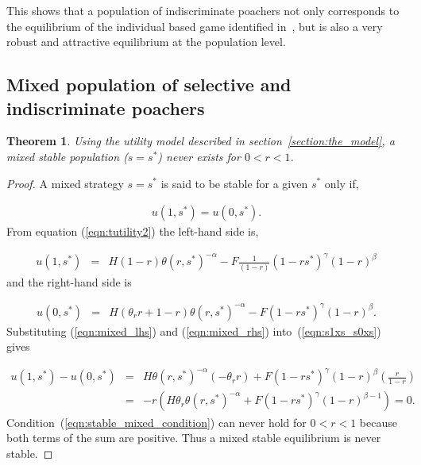 \documentclass[10pt]{article}
\newtheorem{theorem}{Theorem}
\begin{document}
This shows that a population of indiscriminate poachers
not only corresponds to the equilibrium of the individual based
game identified in~\cite{Lee}, but is also a very robust and attractive
equilibrium at the population level.

\subsection{Mixed population of selective and indiscriminate poachers}

\begin{theorem}\label{theorem:mixed}
Using the utility model described in section~\ref{section:the_model}, a mixed
stable population (\(s=s^*\)) never exists for \(0 < r <1\).
\end{theorem}

\begin{proof}
    A mixed strategy \(s = s^*\) is said to be stable for a
    given \(s^*\) only if,

    \begin{eqnarray}
    \label{eqn:s1xs_s0xs}
    u(1,s^*) = u(0,s^*).
    \end{eqnarray}
    From equation (\ref{eqn:tutility2}) the left-hand side is,

    \begin{eqnarray}
    \label{eqn:mixed_lhs}
    u(1,s^*)&=&
    H(1 - r) \theta(r, s^*)^{-\alpha} - F \frac{1}{(1 - r)}(1 - rs^*)^{\gamma}(1 - r)^{\beta}
    \end{eqnarray}
    and the right-hand side is

    \begin{eqnarray}
    \label{eqn:mixed_rhs}
    u(0,s^*)&=&
    H(\theta_rr + 1 - r)\theta(r, s^*)^{-\alpha} - F(1 - rs^*)^{\gamma}(1 - r)^{\beta}.
    \end{eqnarray}
    Substituting (\ref{eqn:mixed_lhs}) and (\ref{eqn:mixed_rhs}) into~(\ref{eqn:s1xs_s0xs}) gives

    \begin{eqnarray}\label{eqn:stable_mixed}
        u(1,s^*) - u(0,s^*) & = & H\theta(r, s^*)^{-\alpha} (-\theta_r r)  + F (1 - rs^*)^{\gamma}(1 - r)^{\beta}(\frac{r}{1-r})\\
    \label{eqn:stable_mixed_condition}
      & = &   - r (H \theta_r \theta(r, s^*)^{-\alpha}  + F (1 - rs^*)^{\gamma}(1 - r)^{\beta - 1}) = 0.
    \end{eqnarray}
    Condition~(\ref{eqn:stable_mixed_condition}) can never hold for \(0 < r <1\)
    because both terms of the sum are positive. Thus a mixed stable equilibrium
    is never stable.
\end{proof}
\end{document}
